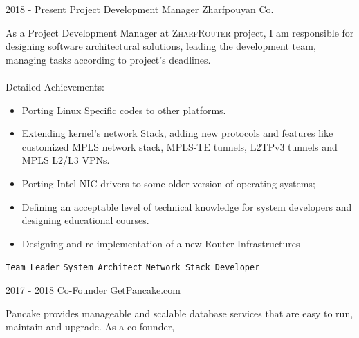 \documentclass[12pt]{developercv}
\begin{document}
\begin{entrylist}
	\entry
		{2018 - Present}
		{Project Development Manager}
		{Zharfpouyan Co.}
		{
		As a Project Development Manager at \textsc{ZharfRouter} project,
		I am responsible for designing software architectural solutions,
		leading the development team, managing tasks according
		to project's deadlines.
		\\
		\\
		Detailed Achievements:
		\begin{itemize}
			\item Porting Linux Specific codes to other platforms.
			\item Extending kernel's network Stack, adding new protocols
			      and features like customized MPLS network stack,
			      MPLS-TE tunnels, L2TPv3 tunnels and MPLS L2/L3 VPNs.
			\item Porting Intel NIC drivers to some older version of
			      operating-systems;
			\item Defining an acceptable level of technical knowledge for
			      system developers and designing educational courses.
			\item Designing and re-implementation of a new Router Infrastructures
		\end{itemize}
		\texttt{Team Leader}\slashsep
		\texttt{System Architect}\slashsep
		\texttt{Network Stack Developer}
		}
	\entry
		{2017 - 2018}
		{Co-Founder}
		{GetPancake.com}
		{
		Pancake provides manageable and scalable database services that
		are easy to run, maintain and upgrade. As a co-founder,

}
\end{entrylist}
\end{document}

